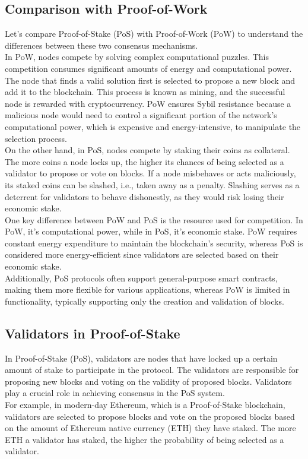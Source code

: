 \subsection{Comparison with Proof-of-Work}
Let's compare Proof-of-Stake (PoS) with Proof-of-Work (PoW) to understand the differences between these two consensus mechanisms.\\
In PoW, nodes compete by solving complex computational puzzles. This competition consumes significant amounts of energy and computational power. The node that finds a valid solution first is selected to propose a new block and add it to the blockchain. This process is known as mining, and the successful node is rewarded with cryptocurrency. PoW ensures Sybil resistance because a malicious node would need to control a significant portion of the network's computational power, which is expensive and energy-intensive, to manipulate the selection process.\\
On the other hand, in PoS, nodes compete by staking their coins as collateral. The more coins a node locks up, the higher its chances of being selected as a validator to propose or vote on blocks. If a node misbehaves or acts maliciously, its staked coins can be slashed, i.e., taken away as a penalty. Slashing serves as a deterrent for validators to behave dishonestly, as they would risk losing their economic stake.\\
One key difference between PoW and PoS is the resource used for competition. In PoW, it's computational power, while in PoS, it's economic stake. PoW requires constant energy expenditure to maintain the blockchain's security, whereas PoS is considered more energy-efficient since validators are selected based on their economic stake.\\
Additionally, PoS protocols often support general-purpose smart contracts, making them more flexible for various applications, whereas PoW is limited in functionality, typically supporting only the creation and validation of blocks.

\subsection{Validators in Proof-of-Stake}
In Proof-of-Stake (PoS), validators are nodes that have locked up a certain amount of stake to participate in the protocol. The validators are responsible for proposing new blocks and voting on the validity of proposed blocks. Validators play a crucial role in achieving consensus in the PoS system.\\
For example, in modern-day Ethereum, which is a Proof-of-Stake blockchain, validators are selected to propose blocks and vote on the proposed blocks based on the amount of Ethereum native currency (ETH) they have staked. The more ETH a validator has staked, the higher the probability of being selected as a validator.

